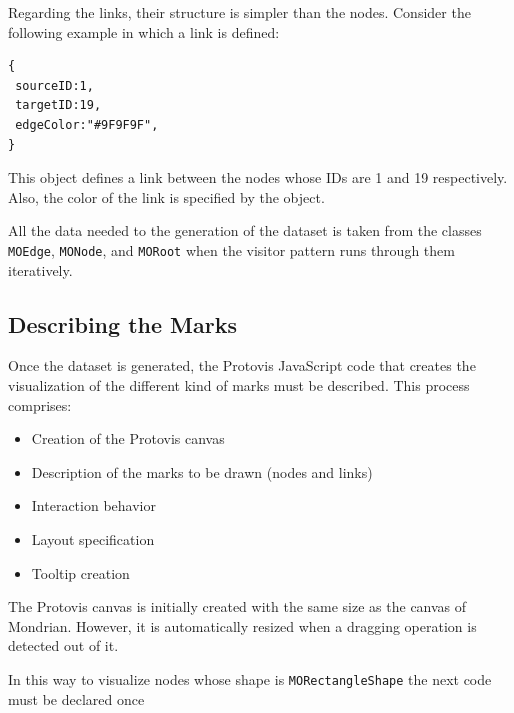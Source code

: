 \documentclass[preprint,10pt]{sigplanconf}
\newcommand{\ct}{\lstinline[backgroundcolor=\color{white},basicstyle=\footnotesize\ttfamily]}
\newcommand{\ab}[1]{\nb{Alexandre}{blue}{#1}}
\newcommand{\sv}[1]{\nb{Santiago}{orange}{#1}}
\newcommand{\TG}[1]{\nb{TG}{magenta}{#1}}
\begin{document}
Regarding the links, their structure is simpler than the nodes. Consider the following example in which a link is defined:
\begin{lstlisting} 
{
 sourceID:1, 
 targetID:19,
 edgeColor:"#9F9F9F",
}
\end{lstlisting}

This object defines a link between the nodes whose IDs are 1 and 19 respectively. Also, the color of the link is specified by the object. 

All the data needed to the generation of the dataset is taken from the classes \ct{MOEdge}, \ct{MONode}, and \ct{MORoot} when the visitor pattern runs through them iteratively.


\subsection{Describing the Marks}

Once the dataset is generated, the Protovis JavaScript code that creates the visualization of the different kind of marks must be described. This process comprises: 
\begin{itemize}
\item Creation of the Protovis canvas
\item Description of the marks to be drawn (nodes and links)
\item Interaction behavior
\item Layout specification
\item Tooltip creation
\end{itemize}

The Protovis canvas is initially created with the same size as the canvas of Mondrian. However, it is automatically resized when a dragging operation is detected out of it.

In this way to visualize nodes whose shape is \ct{MORectangleShape} the next code must be declared once 
\end{document}
